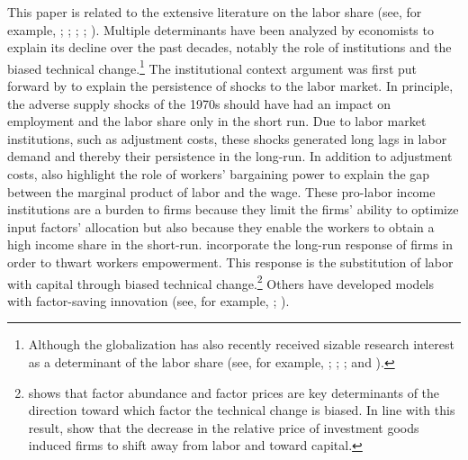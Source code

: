 
This paper is related to the extensive literature on the labor share (see, for example, \citealt{Blanchard1997}; \citealt{Caballero1998}; \citealt{Acemoglu2003}; \citealt{Karabarbounis2014}; \citealt{Autor2019}). Multiple determinants have been analyzed by economists to explain its decline over the past decades, notably the role of institutions and the biased technical change.\footnote{Although the globalization has also recently received sizable research interest as a determinant of the labor share (see, for example, \citealt{Jayadev2007}; \citealt{Pica2010}; \citealt{Young2018}; and \citealt{Autor2019}).}
The institutional context argument was first put forward by \cite{Blanchard1997} to explain the persistence of shocks to the labor market. In principle, the adverse supply shocks of the 1970s should have had an impact on employment and the labor share only in the short run. Due to labor market institutions, such as adjustment costs, these shocks generated long lags in labor demand and thereby their persistence in the long-run.
In addition to adjustment costs, \cite{Bentolila2003} also highlight the role of workers' bargaining power to explain the gap between the marginal product of labor and the wage.
These pro-labor income institutions are a burden to firms because they limit the firms' ability to optimize input factors' allocation but also because they enable the workers to obtain a high income share in the short-run. \cite{Caballero1998} incorporate the long-run response of firms in order to thwart workers empowerment. This response is the substitution of labor with capital through biased technical change.\footnote{\cite{Acemoglu2002} shows that factor abundance and factor prices are key determinants of the direction toward which factor the technical change is biased. In line with this result, \cite{Karabarbounis2014} show that the decrease in the relative price of investment goods induced firms to shift away from labor and toward capital.
} Others have developed models with factor-saving innovation (see, for example, \citealt{Zuleta2008}; \citealt{Peretto2013}).
